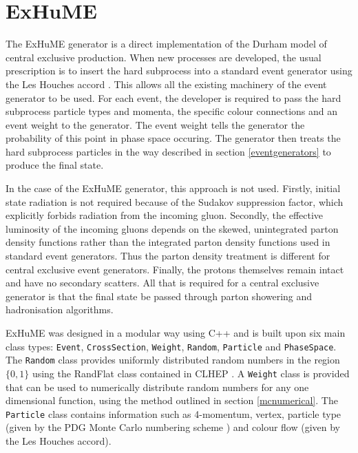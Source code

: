 \section{ExHuME}


The ExHuME generator \cite{Monk:2005ji} is a direct implementation of the Durham model of central exclusive production. When new processes are developed, the usual prescription is to insert the hard subprocess into a standard event generator using the Les Houches accord \cite{Boos:2001cv}. This allows all the existing machinery of the event generator to be used. 
For each event, the developer is required to pass the hard subprocess particle types and momenta, the specific colour connections and an event weight to the generator. The event weight tells the generator the probability of this point in phase space occuring. The generator then treats the hard subprocess particles in the way described in section \ref{eventgenerators} to produce the final state. 

In the case of the ExHuME generator, this approach is not used. Firstly, initial state radiation is not required because of the Sudakov suppression factor, which explicitly forbids radiation from the incoming gluon. Secondly, the effective luminosity of the incoming gluons depends on the skewed, unintegrated parton density functions rather than the integrated parton density functions used in standard event generators. Thus the parton density treatment is different for central exclusive event generators. Finally, the protons themselves remain intact and have no secondary scatters. All that is required for a central exclusive generator is that the final state be passed through parton showering and hadronisation algorithms.

ExHuME was designed in a modular way using C++ and is built upon six main class types: \texttt{Event}, \texttt{CrossSection}, \texttt{Weight}, \texttt{Random}, \texttt{Particle} and  \texttt{PhaseSpace}.  The \texttt{Random} class provides uniformly distributed random numbers in the region $\{0, 1\}$ using the RandFlat class contained in CLHEP \cite{Lonnblad:1994kt}. A \texttt{Weight} class is provided that can be used to numerically distribute random numbers for any one dimensional function, using the method outlined in section \ref{mcnumerical}. The \texttt{Particle} class contains information such as 4-momentum, vertex, particle type (given by the PDG Monte Carlo numbering scheme \cite{Eidelman:2004wy}) and colour flow (given by the Les Houches accord).

